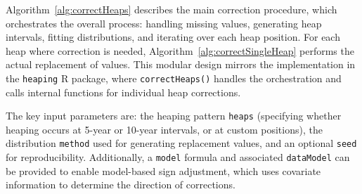 \documentclass[pdflatex,sn-mathphys-num]{sn-jnl}%
\theoremstyle{thmstyleone}%
\theoremstyle{thmstyletwo}%
\theoremstyle{thmstylethree}%
\begin{document}
Algorithm~\ref{alg:correctHeaps} describes the main correction procedure, which orchestrates the overall process: handling missing values, generating heap intervals, fitting distributions, and iterating over each heap position. For each heap where correction is needed, Algorithm~\ref{alg:correctSingleHeap} performs the actual replacement of values. This modular design mirrors the implementation in the \texttt{heaping} R package, where \texttt{correctHeaps()} handles the orchestration and calls internal functions for individual heap corrections.

The key input parameters are: the heaping pattern \texttt{heaps} (specifying whether heaping occurs at 5-year or 10-year intervals, or at custom positions), the distribution \texttt{method} used for generating replacement values, and an optional \texttt{seed} for reproducibility. Additionally, a \texttt{model} formula and associated \texttt{dataModel} can be provided to enable model-based sign adjustment, which uses covariate information to determine the direction of corrections.

\small
\end{document}
